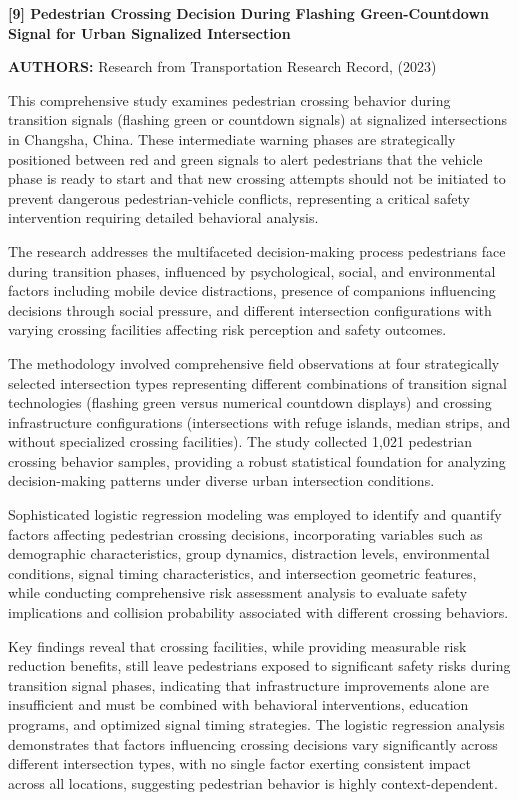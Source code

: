 \documentclass[a4paper, 12pt]{report}
\begin{document}
\noindent \textbf{[9] Pedestrian Crossing Decision During Flashing Green-Countdown Signal for Urban Signalized Intersection}

\textbf{AUTHORS:} Research from Transportation Research Record, (2023)


This comprehensive study examines pedestrian crossing behavior during transition signals (flashing green or countdown signals) at signalized intersections in Changsha, China. These intermediate warning phases are strategically positioned between red and green signals to alert pedestrians that the vehicle phase is ready to start and that new crossing attempts should not be initiated to prevent dangerous pedestrian-vehicle conflicts, representing a critical safety intervention requiring detailed behavioral analysis.

The research addresses the multifaceted decision-making process pedestrians face during transition phases, influenced by psychological, social, and environmental factors including mobile device distractions, presence of companions influencing decisions through social pressure, and different intersection configurations with varying crossing facilities affecting risk perception and safety outcomes.

The methodology involved comprehensive field observations at four strategically selected intersection types representing different combinations of transition signal technologies (flashing green versus numerical countdown displays) and crossing infrastructure configurations (intersections with refuge islands, median strips, and without specialized crossing facilities). The study collected 1,021 pedestrian crossing behavior samples, providing a robust statistical foundation for analyzing decision-making patterns under diverse urban intersection conditions.

Sophisticated logistic regression modeling was employed to identify and quantify factors affecting pedestrian crossing decisions, incorporating variables such as demographic characteristics, group dynamics, distraction levels, environmental conditions, signal timing characteristics, and intersection geometric features, while conducting comprehensive risk assessment analysis to evaluate safety implications and collision probability associated with different crossing behaviors.

Key findings reveal that crossing facilities, while providing measurable risk reduction benefits, still leave pedestrians exposed to significant safety risks during transition signal phases, indicating that infrastructure improvements alone are insufficient and must be combined with behavioral interventions, education programs, and optimized signal timing strategies. The logistic regression analysis demonstrates that factors influencing crossing decisions vary significantly across different intersection types, with no single factor exerting consistent impact across all locations, suggesting pedestrian behavior is highly context-dependent.
\end{document}
